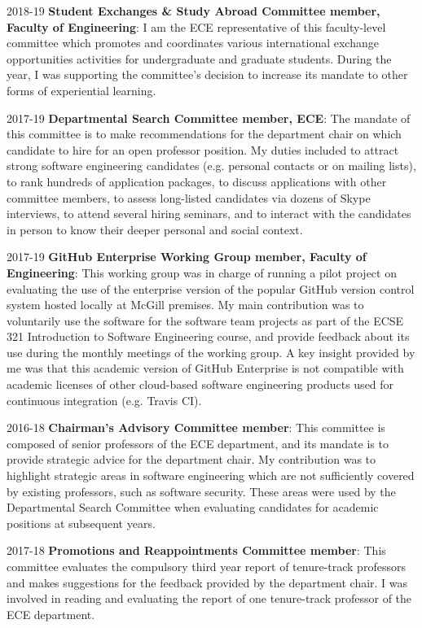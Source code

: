 \begin{yearlist}
\item[2018-19] \textbf{Student Exchanges \& Study Abroad Committee member, Faculty of Engineering}: I am the ECE representative of this faculty-level committee which promotes and coordinates various international exchange opportunities activities for undergraduate and graduate students. During the year, I was supporting the committee's decision to increase its mandate to other forms of experiential learning. 
\item[2017-19] \textbf{Departmental Search Committee member, ECE}: The mandate of this committee is to make recommendations for the department chair on which candidate to hire for an open professor position. My duties included to attract strong software engineering candidates (e.g. personal contacts or on mailing lists), to rank hundreds of application packages, to discuss applications with other committee members, to assess long-listed candidates via dozens of Skype interviews, to attend several hiring seminars, and to interact with the candidates in person to know their deeper personal and social context.
\item[2017-19] \textbf{GitHub Enterprise Working Group member, Faculty of Engineering}: This working group was in charge of running a pilot project on evaluating the use of the enterprise version of the popular GitHub version control system hosted locally at McGill premises. My main contribution was to voluntarily use the software for the software team projects as part of the ECSE 321 Introduction to Software Engineering course, and provide feedback about its use during the monthly meetings of the working group. A key insight provided by me was that this academic version of GitHub Enterprise is not compatible with academic licenses of other cloud-based software engineering products used for continuous integration (e.g. Travis CI).
\item[2016-18] \textbf{Chairman's Advisory Committee member}: This committee is composed of senior professors of the ECE department, and its mandate is to provide strategic advice for the department chair. My contribution was to highlight strategic areas in software engineering which are not sufficiently covered by existing professors, such as software security. These areas were used by the Departmental Search Committee when evaluating candidates for academic positions at subsequent years.
\item[2017-18] \textbf{Promotions and Reappointments Committee member}: This committee evaluates the compulsory third year report of tenure-track professors and makes suggestions for the feedback provided by the department chair. I was involved in reading and evaluating the report of one tenure-track professor of the ECE department. 

\end{yearlist}
